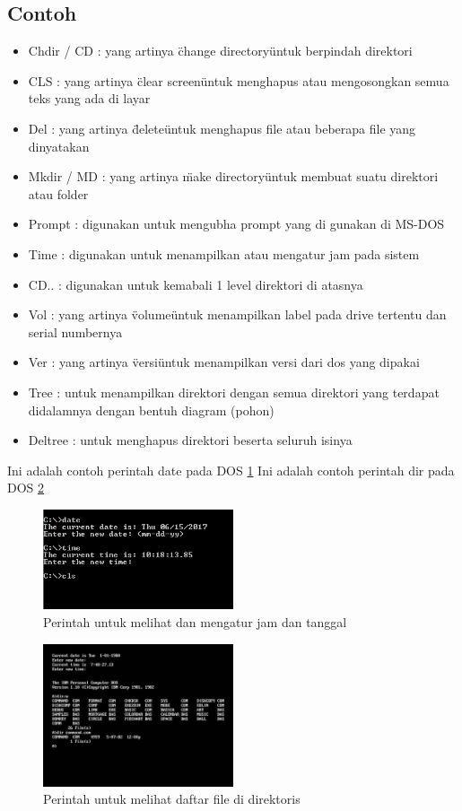 		\subsection{Contoh}
		\begin{itemize}
			\item Chdir / CD : yang artinya \"change directory\" untuk berpindah direktori
			\item CLS : yang artinya \"clear screen\" untuk menghapus atau mengosongkan semua teks yang ada di layar
			\item Del : yang artinya \"delete\" untuk menghapus file atau beberapa file yang dinyatakan
			\item Mkdir / MD : yang artinya \"make directory\" untuk membuat suatu direktori atau folder
			\item Prompt : digunakan untuk mengubha prompt yang di gunakan di MS-DOS
			\item Time : digunakan untuk menampilkan atau mengatur jam pada sistem
			\item CD.. : digunakan untuk kemabali 1 level direktori di atasnya
			\item Vol : yang artinya \"volume\" untuk menampilkan label pada drive tertentu dan serial numbernya
			\item Ver : yang artinya \"versi\" untuk menampilkan versi dari dos yang dipakai
			\item Tree : untuk menampilkan direktori dengan semua direktori yang terdapat didalamnya dengan bentuh diagram (pohon)
			\item Deltree : untuk menghapus direktori beserta seluruh isinya
		\end{itemize}
		Ini adalah contoh perintah date pada DOS \ref{date}
		Ini adalah contoh perintah dir pada DOS \ref{dir}
			\begin{figure}[ht]
			\centerline{\includegraphics[width=0.5\textwidth]{figures/date.png}}
			\caption{Perintah untuk melihat dan mengatur jam dan tanggal}
			\label{date}
			\end{figure}
			
			\begin{figure}[ht]
			\centerline{\includegraphics[width=0.5\textwidth]{figures/dir.jpg}}
			\caption{Perintah untuk melihat daftar file di direktoris}
			\label{dir}
			\end{figure}
			
